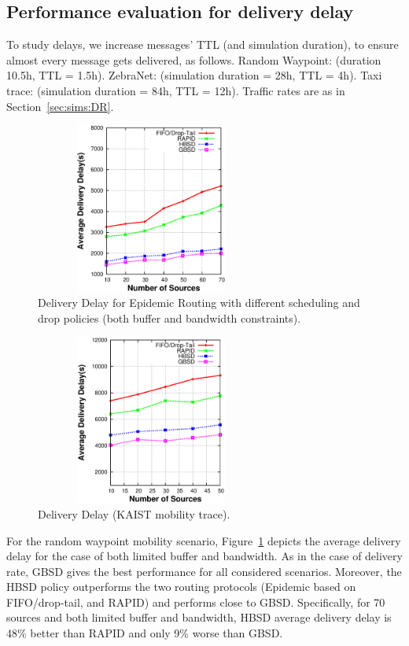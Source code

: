 \subsection{Performance evaluation for delivery delay}
\label{sec:sims:DD}

To study delays, we increase messages' TTL (and simulation duration), to ensure almost every message gets delivered, as follows. Random Waypoint: (duration 10.5h, TTL = 1.5h). ZebraNet: (simulation duration = 28h, TTL = 4h). Taxi trace:  (simulation duration = 84h, TTL = 12h). Traffic rates are as in Section~\ref{sec:sims:DR}.

\begin{figure}[!h]
\centering
\includegraphics[width=3in,height=2.2in]{Chapitre3/fig3.eps}
\caption{Delivery Delay for Epidemic Routing with different scheduling and drop policies (both buffer and bandwidth constraints).}
\label{DD-RWP}
\end{figure}

\begin{figure}[!h]
\centering
\includegraphics[width=3in,height=2.2in]{Chapitre3/fig33.eps}
\caption{Delivery Delay (KAIST mobility trace).}
\label{DD-KAIST}
\end{figure}

For the random waypoint mobility scenario, Figure~\ref{DD-RWP} depicts the average delivery delay for the case of both limited buffer and
bandwidth. As in the case of delivery rate, GBSD gives the best performance for all considered scenarios. Moreover, the HBSD policy
outperforms the two routing protocols (Epidemic based on FIFO/drop-tail, and RAPID) and performs close to GBSD. Specifically,
for 70 sources and both limited buffer and bandwidth, HBSD average delivery delay is 48\% better than RAPID and only 9\% worse than
GBSD.

